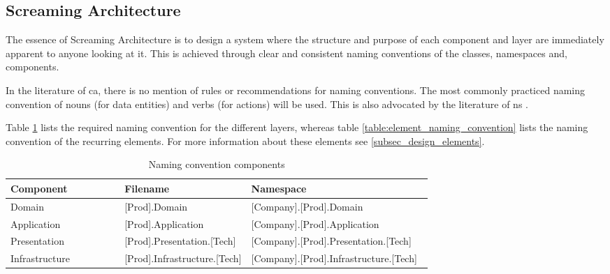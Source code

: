 \subsection{Screaming Architecture}
The essence of Screaming Architecture is to design a system where the structure and
purpose of each component and layer are immediately apparent to anyone looking at it. This
is achieved through clear and consistent naming conventions of the classes, namespaces and,
components.

In the literature of \gls{ca}, there is no mention of rules or recommendations for naming
conventions. The most commonly practiced naming convention of nouns (for data entities)
and verbs (for actions) will be used. This is also advocated by the literature of \gls{ns}
\parencite[357]{mannaert_normalized_2016}.

Table \ref{table:component_naming_convention} lists the required naming convention for the
different layers, whereas table \ref{table:element_naming_convention} lists the naming
convention of the recurring elements. For more information about these elements see
\ref{subsec_design_elements}.

\begin{table}[ht]
    \small
    \begin{tabular}{ l p{0.30\linewidth} p{0.43\linewidth} }
    \hline
    \textbf{Component} & \textbf{Filename} & \textbf{Namespace} \\ 
    \hline
    Domain & [Prod].Domain & [Company].[Prod].Domain \\
    Application & [Prod].Application & [Company].[Prod].Application \\
    Presentation & [Prod].Presentation.[Tech] & [Company].[Prod].Presentation.[Tech] \\
    Infrastructure & [Prod].Infrastructure.[Tech] & [Company].[Prod].Infrastructure.[Tech]
    \\ \hline
    \end{tabular}
\caption{Naming convention components}
\label{table:component_naming_convention}
\end{table}

